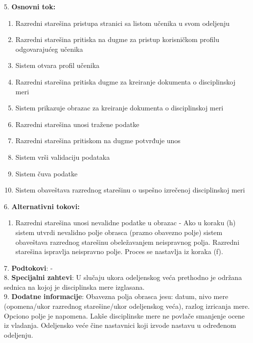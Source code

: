 \documentclass{article}
\begin{document}
5. \textbf{Osnovni tok:} 
\begin{enumerate} [label=(\alph*)]
\item Razredni starešina pristupa stranici sa listom učenika u svom odeljenju
\item Razredni starešina pritiska na dugme za pristup korisničkom profilu odgovarajućeg učenika
\item Sistem otvara profil učenika
\item Razredni starešina pritiska dugme za kreiranje dokumenta o disciplinskoj meri
\item Sistem prikazuje obrazac za kreiranje dokumenta o disciplinskoj meri 
\item Razredni starešina unosi tražene podatke
\item Razredni starešina pritiskom na dugme potvrđuje unos
\item Sistem vrši validaciju podataka
\item Sistem čuva podatke
\item Sistem obaveštava razrednog starešinu o uspešno izrečenoj disciplinskoj meri
\end{enumerate}

6. \textbf{Alternativni tokovi:}
\begin{enumerate} [label=(\roman*)]
\item Razredni starešina unosi nevalidne podatke u obrazac - Ako u koraku (h) sistem utvrdi nevalidno polje obrasca (prazno obavezno polje) sistem obaveštava razrednog starešinu obeležavanjem neispravnog polja. Razredni starešina ispravlja neispravno polje. Proces se nastavlja iz koraka (f).
\end{enumerate}

7. \textbf{Podtokovi}: - \\

8. \textbf{Specijalni zahtevi}: U slučaju ukora odeljenskog veća prethodno je održana sednica na kojoj je disciplinska mere izglasana. \\

9. \textbf{Dodatne informacije}: Obavezna polja obrasca jesu: datum, nivo mere (opomena/ukor razrednog starešine/ukor odeljenskog veća), razlog izricanja mere. Opciono polje je napomena. Lakše disciplinske mere ne povlače smanjenje ocene iz vladanja. Odeljensko veće čine nastavnici koji izvode nastavu u određenom odeljenju. \\
\end{document}
